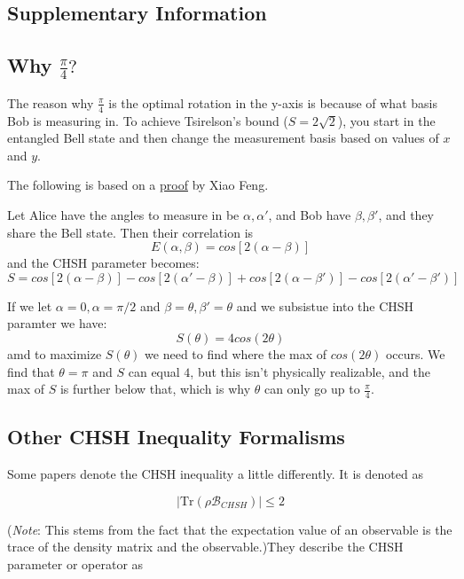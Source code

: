 \documentclass[a4paper, onecolumn, 11pt, titlepage]{quantumarticle}
\begin{document}
\newpage


\newpage{}

\begin{appendices}
\section{Supplementary Information}\label{firstappendix}

\subsection{Why $\frac{\pi}{4}?$}

The reason why $\frac{\pi}{4}$ is the optimal rotation in the y-axis is because of what basis Bob is measuring in. To achieve Tsirelson's bound ($S = 2\sqrt2$), you start in the entangled Bell state and then change the measurement basis based on values of $x$ and $y$. 

The following is based on a \href{ttps://math.ucsd.edu/sites/math.ucsd.edu/files/XiaoFeng.pdf}{proof} by Xiao Feng.

Let Alice have the angles to measure in be $\alpha, \alpha'$, and Bob have $\beta, \beta'$, and they share the Bell state. Then their correlation is
$$E(\alpha, \beta) = cos[2(\alpha -\beta)]$$
and the CHSH parameter becomes:
$$S = cos[2(\alpha -\beta)] - cos[2(\alpha' -\beta)] + cos[2(\alpha -\beta')] - cos[2(\alpha' -\beta')]$$

If we let $\alpha = 0, \alpha = \pi/2$ and $\beta = \theta, \beta' = \theta$ and we subsistue into the CHSH paramter we have:
$$S(\theta) = 4cos(2\theta)$$ 
amd to maximize $S(\theta)$ we need to find where the max of $cos(2\theta)$ occurs. We find that $\theta = \pi$ and $S$ can equal $4$, but this isn't physically realizable, and the max of $S$ is further below that, which is why $\theta$ can only go up to $\frac{\pi}{4}$.

\subsection{Other CHSH Inequality Formalisms}
Some papers denote the CHSH inequality a little differently. It is denoted as 

$$\left|\text{Tr}\left(\rho \mathcal{B}_{CHSH}\right) \right| \leq 2$$

(\textit{Note}: This stems from the fact that the expectation value of an observable is the trace of the density matrix and the observable.)They describe the CHSH parameter or operator as 


\end{appendices}
\end{document}
